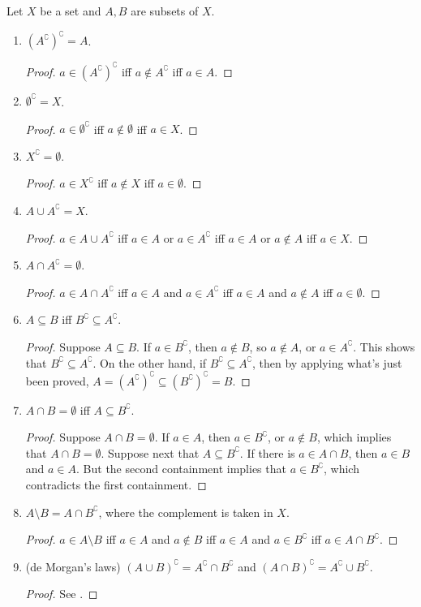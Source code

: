 \documentclass[12pt]{article}
\begin{document}
Let $X$ be a set and $A,B$ are subsets of $X$.

\begin{enumerate}
\item $(A^{\complement})^\complement=A$.
\begin{proof}  $a\in (A^{\complement})^\complement$ iff $a\notin A^{\complement}$ iff $a\in A$.
\end{proof}
\item $\emptyset^\complement = X$.
\begin{proof}
$a\in \emptyset^\complement$ iff $a\notin \emptyset$ iff $a\in X$.
\end{proof}
\item $X^\complement = \emptyset$.
\begin{proof}
$a\in X^\complement$ iff $a\notin X$ iff $a\in \emptyset$.
\end{proof}
\item $A\cup A^\complement = X$.
\begin{proof}
$a\in A\cup A^\complement$ iff $a\in A$ or $a\in A^\complement$ iff $a\in A$ or $a\notin A$ iff $a\in X$.
\end{proof}
\item $A\cap A^\complement =\emptyset$.
\begin{proof}
$a\in A\cap A^\complement$ iff $a\in A$ and $a\in A^\complement$ iff $a\in A$ and $a\notin A$ iff $a\in \emptyset$.
\end{proof}
\item $A\subseteq B$ iff $B^\complement\subseteq A^\complement$.
\begin{proof}
Suppose $A\subseteq B$.  If $a\in B^\complement$, then $a\notin B$, so $a\notin A$, or $a\in A^\complement$.  This shows that $B^\complement\subseteq A^\complement$.  On the other hand, if $B^\complement\subseteq A^\complement$, then by applying what's just been proved, $A=(A^\complement)^\complement \subseteq (B^\complement)^\complement =B$.
\end{proof}
\item $A\cap B=\emptyset$ iff $A\subseteq B^\complement$.
\begin{proof}  Suppose $A\cap B=\emptyset$.  If $a\in A$, then $a\in B^\complement$, or $a\notin B$, which implies that $A\cap B=\emptyset$.  Suppose next that $A\subseteq B^\complement$.  If there is $a\in A\cap B$, then $a\in B$ and $a\in A$.  But the second containment implies that $a\in B^\complement$, which contradicts the first containment.
\end{proof}
\item $A\setminus B = A\cap B^\complement$, where the complement is taken in $X$.
\begin{proof}  $a\in A\setminus B$ iff $a\in A$ and $a\notin B$ iff $a\in A$ and $a\in B^\complement$ iff $a\in A\cap B^\complement$.
\end{proof}
\item (de Morgan's laws) $(A \cup B)^\complement = A^\complement \cap B^\complement$ and $(A \cap B)^\complement = A^\complement \cup B^\complement$.
\begin{proof}  See .
\end{proof}
\end{enumerate}
\end{document}
